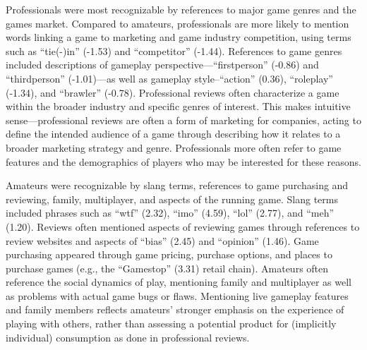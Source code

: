 \documentclass{sig-alternate}
\begin{document}
Professionals were most recognizable by references to major game genres and the games market. Compared to amateurs, professionals are more likely to mention words linking a game to marketing and game industry competition, using terms such as ``tie(-)in'' (-1.53) and ``competitor'' (-1.44). References to game genres included descriptions of gameplay perspective---``firstperson'' (-0.86) and ``thirdperson'' (-1.01)---as well as gameplay style--``action'' (0.36), ``roleplay'' (-1.34),  and ``brawler'' (-0.78). Professional reviews often characterize a game within the broader industry and specific genres of interest. This makes intuitive sense---professional reviews are often a form of marketing for companies, acting to define the intended audience of a game through describing how it relates to a broader marketing strategy and genre. Professionals more often refer to game features and the demographics of players who may be interested for these reasons.

Amateurs were recognizable by slang terms, references to game purchasing and reviewing, family, multiplayer, and aspects of the running game. Slang terms included phrases such as ``wtf'' (2.32), ``imo'' (4.59), ``lol'' (2.77), and ``meh'' (1.20). Reviews often mentioned aspects of reviewing games through references to review websites and aspects of ``bias'' (2.45) and ``opinion'' (1.46). Game purchasing appeared through game pricing, purchase options, and places to purchase games (e.g., the ``Gamestop'' (3.31) retail chain). Amateurs often reference the social dynamics of play, mentioning family and multiplayer as well as problems with actual game bugs or flaws. Mentioning live gameplay features and family members reflects amateurs' stronger emphasis on the experience of playing with others, rather than assessing a potential product for (implicitly individual) consumption as done in professional reviews.

\end{document}
